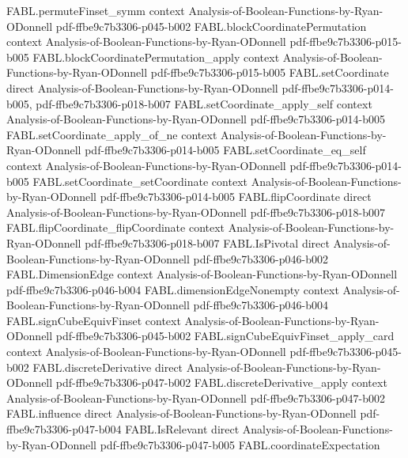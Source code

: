 \begin{theorem}
  {FABL.permuteFinset_symm}
  {context}
  {Analysis-of-Boolean-Functions-by-Ryan-ODonnell}
  {pdf-ffbe9c7b3306-p045-b002}
\proofstep
  {FABL.blockCoordinatePermutation}
  {context}
  {Analysis-of-Boolean-Functions-by-Ryan-ODonnell}
  {pdf-ffbe9c7b3306-p015-b005}
\proofstep
  {FABL.blockCoordinatePermutation_apply}
  {context}
  {Analysis-of-Boolean-Functions-by-Ryan-ODonnell}
  {pdf-ffbe9c7b3306-p015-b005}
\proofstep
  {FABL.setCoordinate}
  {direct}
  {Analysis-of-Boolean-Functions-by-Ryan-ODonnell}
  {pdf-ffbe9c7b3306-p014-b005,
    pdf-ffbe9c7b3306-p018-b007}
\proofstep
  {FABL.setCoordinate_apply_self}
  {context}
  {Analysis-of-Boolean-Functions-by-Ryan-ODonnell}
  {pdf-ffbe9c7b3306-p014-b005}
\proofstep
  {FABL.setCoordinate_apply_of_ne}
  {context}
  {Analysis-of-Boolean-Functions-by-Ryan-ODonnell}
  {pdf-ffbe9c7b3306-p014-b005}
\proofstep
  {FABL.setCoordinate_eq_self}
  {context}
  {Analysis-of-Boolean-Functions-by-Ryan-ODonnell}
  {pdf-ffbe9c7b3306-p014-b005}
\proofstep
  {FABL.setCoordinate_setCoordinate}
  {context}
  {Analysis-of-Boolean-Functions-by-Ryan-ODonnell}
  {pdf-ffbe9c7b3306-p014-b005}
\proofstep
  {FABL.flipCoordinate}
  {direct}
  {Analysis-of-Boolean-Functions-by-Ryan-ODonnell}
  {pdf-ffbe9c7b3306-p018-b007}
\proofstep
  {FABL.flipCoordinate_flipCoordinate}
  {context}
  {Analysis-of-Boolean-Functions-by-Ryan-ODonnell}
  {pdf-ffbe9c7b3306-p018-b007}
\proofstep
  {FABL.IsPivotal}
  {direct}
  {Analysis-of-Boolean-Functions-by-Ryan-ODonnell}
  {pdf-ffbe9c7b3306-p046-b002}
\proofstep
  {FABL.DimensionEdge}
  {context}
  {Analysis-of-Boolean-Functions-by-Ryan-ODonnell}
  {pdf-ffbe9c7b3306-p046-b004}
\proofstep
  {FABL.dimensionEdgeNonempty}
  {context}
  {Analysis-of-Boolean-Functions-by-Ryan-ODonnell}
  {pdf-ffbe9c7b3306-p046-b004}
\proofstep
  {FABL.signCubeEquivFinset}
  {context}
  {Analysis-of-Boolean-Functions-by-Ryan-ODonnell}
  {pdf-ffbe9c7b3306-p045-b002}
\proofstep
  {FABL.signCubeEquivFinset_apply_card}
  {context}
  {Analysis-of-Boolean-Functions-by-Ryan-ODonnell}
  {pdf-ffbe9c7b3306-p045-b002}
\proofstep
  {FABL.discreteDerivative}
  {direct}
  {Analysis-of-Boolean-Functions-by-Ryan-ODonnell}
  {pdf-ffbe9c7b3306-p047-b002}
\proofstep
  {FABL.discreteDerivative_apply}
  {context}
  {Analysis-of-Boolean-Functions-by-Ryan-ODonnell}
  {pdf-ffbe9c7b3306-p047-b002}
\proofstep
  {FABL.influence}
  {direct}
  {Analysis-of-Boolean-Functions-by-Ryan-ODonnell}
  {pdf-ffbe9c7b3306-p047-b004}
\proofstep
  {FABL.IsRelevant}
  {direct}
  {Analysis-of-Boolean-Functions-by-Ryan-ODonnell}
  {pdf-ffbe9c7b3306-p047-b005}
\proofstep
  {FABL.coordinateExpectation}

\end{theorem}
